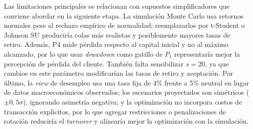 Las limitaciones principales se relacionan con supuestos simplificadores que conviene abordar en la siguiente etapa. La simulaci\'on Monte Carlo usa retornos normales pese al rechazo emp\'irico de normalidad; reemplazarlos por t-Student o Johnson SU producir\'ia colas m\'as realistas y posiblemente mayores tasas de retiro. Adem\'as, P4 mide p\'erdida respecto al capital inicial y no al m\'aximo alcanzado, por lo que usar \textit{drawdown} como gatillo de $P_1$ representar\'ia mejor la percepci\'on de p\'erdida del cliente. Tambi\'en falta sensibilizar $s = 20$, ya que cambios en este par\'ametro modificar\'ian las tasas de retiro y aceptaci\'on. Por \'ultimo, la \textit{view} de desempleo usa una tasa fija de 4\% frente a 5\% neutral en lugar de datos macroecon\'omicos observados; los escenarios proyectados son sim\'etricos ($\pm 0,5\sigma$), ignorando asimetr\'ia negativa; y la optimizaci\'on no incorpora costos de transacci\'on expl\'icitos, por lo que agregar restricciones o penalizaciones de rotaci\'on reducir\'ia el \textit{turnover} y alinear\'ia mejor la optimizaci\'on con la simulaci\'on.
